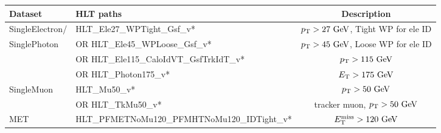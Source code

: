 \footnotesize
\begin{tabular}{l|l|c}
  \hline
  Dataset        & HLT paths                                    & Description\\
  \hline \hline
  \ttfamily SingleElectron/& \ttfamily HLT\_Ele27\_WPTight\_Gsf\_v*                 & $\pt>27\unit{GeV}$, Tight WP for ele ID  \\
  \ttfamily SinglePhoton   & \ttfamily OR HLT\_Ele45\_WPLoose\_Gsf\_v*              & $\pt>45\unit{GeV}$, Loose WP for ele ID  \\
                 & \ttfamily OR HLT\_Ele115\_CaloIdVT\_GsfTrkIdT\_v*      & $\pt>115\unit{GeV}$  \\
                 & \ttfamily OR HLT\_Photon175\_v*                        & $\Et>175\unit{GeV}$  \\
  \hline
  \ttfamily SingleMuon     & \ttfamily HLT\_Mu50\_v*                                & $\pt>50\unit{GeV}$ \\
                 & \ttfamily OR HLT\_TkMu50\_v*                           & tracker muon, $\pt>50\unit{GeV}$ \\
  \hline
  \ttfamily MET            & \ttfamily HLT\_PFMETNoMu120\_PFMHTNoMu120\_IDTight\_v* & $\Etmiss>120\unit{GeV}$ \\
  \hline
\end{tabular}
